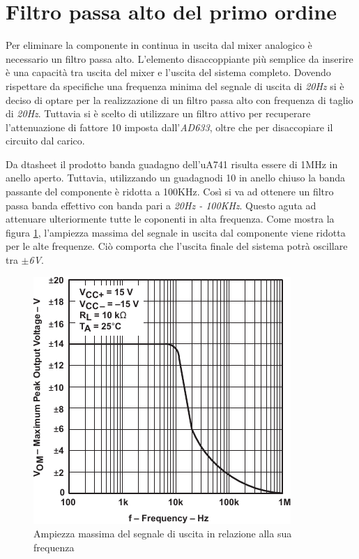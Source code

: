 \documentclass[titlepage]{report}
\begin{document}
\newpage
\section{Filtro passa alto del primo ordine}
\label{sec:filtro_hp1}
	Per eliminare la componente in continua in uscita dal mixer analogico è necessario un filtro passa alto. L'elemento disaccoppiante più semplice da inserire è una capacità tra uscita del mixer e l'uscita del sistema completo.
	Dovendo rispettare da specifiche una frequenza minima del segnale di uscita di \textit{20Hz} si è deciso di optare per la realizzazione di un filtro passa alto con frequenza di taglio di \textit{20Hz}. Tuttavia si è scelto di utilizzare un filtro attivo per recuperare l'attenuazione di fattore 10 imposta dall'\textit{AD633}, oltre che per disaccopiare il circuito dal carico.
	
	Da dtasheet il prodotto banda guadagno dell'uA741 risulta essere di 1MHz in anello aperto. Tuttavia, utilizzando un guadagnodi 10 in anello chiuso la banda passante del componente è ridotta a 100KHz. Così si va ad ottenere un filtro passa banda effettivo con banda pari a \textit{20Hz - 100KHz}. Questo aguta ad attenuare ulteriormente tutte le coponenti in alta frequenza.
	Come mostra la figura \ref{fig:gbp_ua741}, l'ampiezza massima del segnale in uscita dal componente viene ridotta per le alte frequenze. Ciò comporta che l'uscita finale del sistema potrà oscillare tra  \textit{$\pm$6V}.

	\begin{figure}[H]
		\centering
		\includegraphics[scale=1]{Immagini/gbp_ua741.pdf}
		\caption{Ampiezza massima del segnale di uscita in relazione alla sua frequenza}
		\label{fig:gbp_ua741}
	\end{figure}
\end{document}
